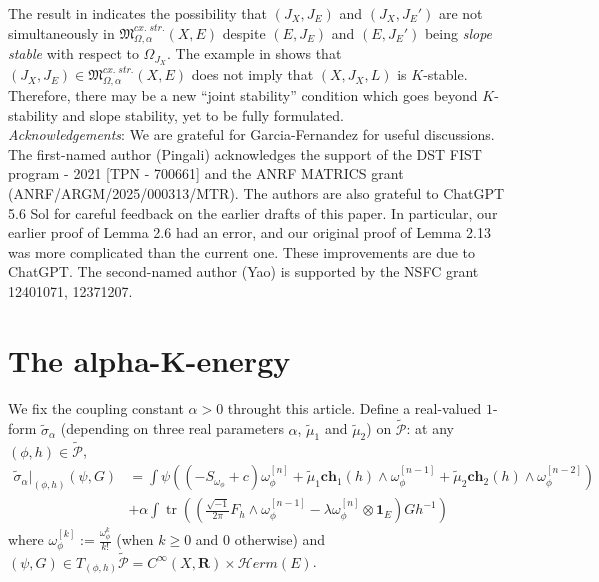 \documentclass[10pt, letterpaper]{amsart}
\newcommand{\tr}{\operatorname{tr}}
\theoremstyle{plain}
\theoremstyle{definition}
\numberwithin{equation}{section}
\begin{document}
The result in \cite{AllGV} indicates the possibility that $(J_X, J_E)$ and $(J_X, J_E')$ are not simultaneously in $\mathfrak{M}_{\Omega,\alpha}^{cx.\; str.}\left(X,E\right)$ despite  $\left(E, J_E\right)$ and $\left(E,J_E'\right)$ being \emph{slope stable} with respect to $\Omega_{J_X}$. The example in \cite{KT} shows that $(J_X, J_E)\in \mathfrak{M}_{\Omega,\alpha}^{cx.\; str.}\left(X,E\right)$ does not imply that $(X, J_X, L)$ is $K$-stable. Therefore, there may be a new ``joint stability'' condition which goes beyond $K$-stability and slope stability, yet to be fully formulated. \\



\emph{Acknowledgements}: We are grateful for Garcia-Fernandez for useful discussions. The first-named author (Pingali) acknowledges the support of the DST FIST program - 2021 [TPN - 700661] and the ANRF MATRICS grant (ANRF/ARGM/2025/000313/MTR). The authors are also grateful to ChatGPT 5.6 Sol for careful feedback on the earlier drafts of this paper. In particular, our earlier proof of Lemma 2.6 had an error, and our original proof of Lemma 2.13 was more complicated than the current one. These improvements are due to ChatGPT. The second-named author (Yao) is supported by the NSFC grant 12401071, 12371207.

\section{The alpha-K-energy}\label{sec:NewMabuchi}
We fix the coupling constant $\alpha>0$ throught this article. Define a real-valued $1$-form $\widetilde{\sigma}_\alpha$ (depending on three real parameters $\alpha$, $\widetilde\mu_1$ and $\widetilde\mu_2$) on $\widetilde{\mathcal{P}}$: at any $(\phi,h)\in \widetilde{\mathcal{P}}$, 
\begin{equation}
\label{def:moment-map-one-form}
\begin{split}
\widetilde{\sigma}_\alpha|_{\left(\phi,h\right)}\left(\psi, G\right)
& = 
\int \psi \left( \left( -S_{\omega_\phi}+c\right)\omega_\phi^{[n]} 
+ 
\widetilde\mu_1 \mathbf{ch}_1\left(h\right) \wedge \omega_\phi^{[n-1]} 
+ 
\widetilde\mu_2 \mathbf{ch}_2\left(h\right)\wedge\omega_\phi^{[n-2]}
\right)\\
& + 
\alpha\int \tr \left( \left( \frac{\sqrt{-1}}{2\pi}F_{h}\wedge \omega_\phi^{[n-1]}-\lambda \omega_\phi^{[n]}\otimes \mathbf{1}_E\right) Gh^{-1}\right)
\end{split}
\end{equation}
where $\omega_{\phi}^{[k]}:=\frac{\omega_{\phi}^k}{k!}$ (when $k\geq 0$ and $0$ otherwise) and $\left(\psi,G\right)\in T_{\left(\phi,h\right)}\widetilde{\mathcal{P}}=C^\infty\left(X,\mathbf{R}\right)\times \mathcal{H}erm\left(E\right)$.
\end{document}
